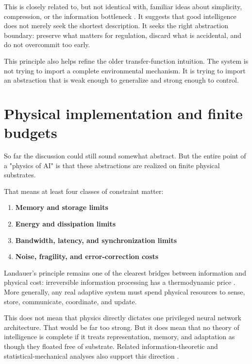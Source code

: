 \documentclass[11pt]{article}
\begin{document}
This is closely related to, but not identical with, familiar ideas about simplicity, compression, or the information bottleneck \citep{tishby2000}. It suggests that good intelligence does not merely seek the shortest description. It seeks the right abstraction boundary: preserve what matters for regulation, discard what is accidental, and do not overcommit too early.

This principle also helps refine the older transfer-function intuition. The system is not trying to import a complete environmental mechanism. It is trying to import an abstraction that is weak enough to generalize and strong enough to control.

\section{Physical implementation and finite budgets}


So far the discussion could still sound somewhat abstract. But the entire point of a "physics of AI" is that these abstractions are realized on finite physical substrates.

That means at least four classes of constraint matter:

\begin{enumerate}
\item \textbf{Memory and storage limits}
\item \textbf{Energy and dissipation limits}
\item \textbf{Bandwidth, latency, and synchronization limits}
\item \textbf{Noise, fragility, and error-correction costs}

\end{enumerate}

Landauer's principle remains one of the clearest bridges between information and physical cost: irreversible information processing has a thermodynamic price \citep{landauer1961}. More generally, any real adaptive system must spend physical resources to sense, store, communicate, coordinate, and update.

This does not mean that physics directly dictates one privileged neural network architecture. That would be far too strong. But it does mean that no theory of intelligence is complete if it treats representation, memory, and adaptation as though they floated free of substrate. Related information-theoretic and statistical-mechanical analyses also support this direction \citep{xu2017,bahri2020}.
\end{document}

